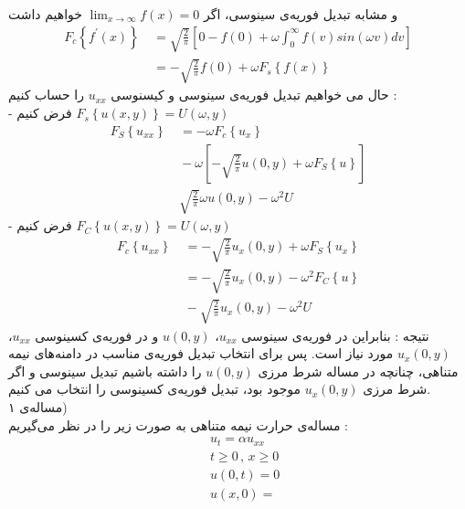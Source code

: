 و مشابه تبدیل فوریه‌ی سینوسی، اگر
$\lim_{x\to\infty}f(x)=0$
خواهیم داشت
\begin{equation*}
	\begin{aligned}
		F_c\left\{f^\prime(x)\right\}
		&\ =\sqrt{\frac2\pi}\left[
		0-f(0)+\omega\int_0^\infty f(v)sin(\omega v)dv
		\right]
		\\ &\
		=-\sqrt{\frac2\pi}f(0)+\omega F_s\left\{f(x)\right\}
	\end{aligned}
\end{equation*}
حال می خواهیم تبدیل فوریه‌ی سینوسی و کیسنوسی
$u_{xx}$
را حساب کنیم :\\
- فرض کنیم
$F_s\left\{u(x,y)\right\}=U(\omega,y)$
\begin{equation*}
	\begin{aligned}
		F_S\left\{u_{xx}\right\} &\
		=-\omega F_c\left\{u_x\right\}
		\\ &\
		-\omega\left[
		-\sqrt{\frac2\pi}u(0,y)+\omega F_S\left\{u\right\}
		\right]
		\\ &\
		\sqrt{\frac2\pi}\omega u(0,y)-\omega^2 U
	\end{aligned}
\end{equation*}
- فرض کنیم
$F_C\left\{u(x,y)\right\}=U(\omega,y)$
\begin{equation*}
	\begin{aligned}
		F_c\left\{u_{xx}\right\}
		&\
		=-\sqrt{\frac2\pi}u_x(0,y)+\omega F_S\left\{u_x\right\}
		\\ &\
		=-\sqrt{\frac2\pi}u_x(0,y)-\omega^2 F_C\left\{u\right\}
		\\ &\
		-\sqrt{\frac2\pi}u_x(0,y)-\omega^2U
	\end{aligned}
\end{equation*}
نتیجه : بنابراین در فوریه‌ی سینوسی
$u_{xx}$،
$u(0,y)$
و در فوریه‌ی کسینوسی
$u_{xx}$،
$u_x(0,y)$
مورد نیاز است. پس برای انتخاب تبدیل فوریه‌ی مناسب در دامنه‌های نیمه متناهی، چنانچه در مساله شرط مرزی
$u(0,y)$
را داشته باشیم تبدیل سینوسی و اگر شرط مرزی
$u_x(0,y)$
موجود بود، تبدیل فوریه‌ی کسینوسی را انتخاب می کنیم.\\
مساله‌ی ۱)\\
مساله‌ی حرارت نیمه متناهی به صورت زیر را در نظر می‌گیریم :
\begin{equation*}
	\begin{aligned}
		&\
		u_t=\alpha u_{xx}
		\\ &\
		t\ge 0 \, , \, x\ge 0
		\\ &\
		u(0,t)=0
		\\ &\
		u(x,0)=
	\end{aligned}
\end{equation*}
